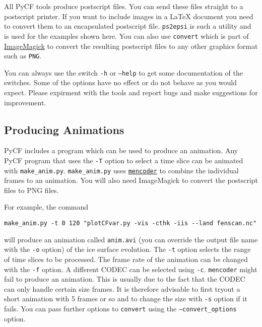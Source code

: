All PyCF tools produce postscript files. You can send these files straight to a postscript printer. If you want to include images in a {\LaTeX} document you need to convert them to an encapsulated postscript file. \texttt{ps2epsi} is such a utility and is used for the examples shown here. You can also use \texttt{convert} which is part of \href{http://www.imagemagick.org/script/index.php}{ImageMagick} to convert the resulting postscript files to any other graphics format such as \texttt{PNG}.

You can always use the switch \texttt{-h} or \texttt{--help} to get some documentation of the switches. Some of the options have no effect or do not behave as you would expect. Please expirment with the tools and report bugs and make suggestions for improvement. 











\subsection{Producing Animations}
PyCF includes a program which can be used to produce an animation. Any PyCF program that uses the \texttt{-T} option to select a time slice can be animated with \texttt{make\_anim.py}. \texttt{make\_anim.py} uses \href{http://www.mplayerhq.hu/homepage/design7/news.html}{\texttt{mencoder}} to combine the individual frames to an animation. You will also need ImageMagick to convert the postscript files to PNG files.

For example, the command
\begin{verbatim}
make_anim.py -t 0 120 "plotCFvar.py -vis -cthk -iis --land fenscan.nc"
\end{verbatim}
will produce an animation called \texttt{anim.avi} (you can override the output file name with the \texttt{-o} option) of the ice surface evolution. The \texttt{-t} option selects the range of time slices to be processed. The frame rate of the animation can be changed with the \texttt{-f} option. A different CODEC can be selected using \texttt{-c}. \texttt{mencoder} might fail to produce an animation. This is usually due to the fact that the CODEC can only handle certain size frames. It is therefore advisable to first tryout a short animation with 5 frames or so and to change the size with \texttt{-s} option if it fails. You can pass further options to \texttt{convert} using the \texttt{--convert\_options} option.
